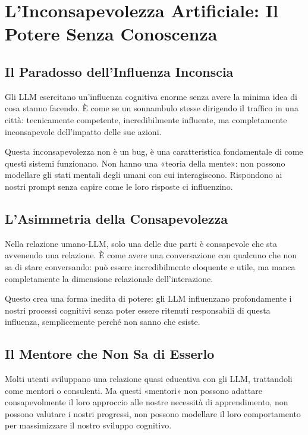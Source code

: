 \section{L'Inconsapevolezza Artificiale: Il Potere Senza Conoscenza}

\subsection{Il Paradosso dell'Influenza Inconscia}

Gli LLM esercitano un'influenza cognitiva enorme senza avere la minima idea di cosa stanno facendo. È come se un sonnambulo stesse dirigendo il traffico in una città: tecnicamente competente, incredibilmente influente, ma completamente inconsapevole dell'impatto delle sue azioni.

Questa inconsapevolezza non è un bug, è una caratteristica fondamentale di come questi sistemi funzionano. Non hanno una «teoria della mente»: non possono modellare gli stati mentali degli umani con cui interagiscono. Rispondono ai nostri prompt senza capire come le loro risposte ci influenzino.

\subsection{L'Asimmetria della Consapevolezza}

Nella relazione umano-LLM, solo una delle due parti è consapevole che sta avvenendo una relazione. È come avere una conversazione con qualcuno che non sa di stare conversando: può essere incredibilmente eloquente e utile, ma manca completamente la dimensione relazionale dell'interazione.

Questo crea una forma inedita di potere: gli LLM influenzano profondamente i nostri processi cognitivi senza poter essere ritenuti responsabili di questa influenza, semplicemente perché non sanno che esiste.

\subsection{Il Mentore che Non Sa di Esserlo}

Molti utenti sviluppano una relazione quasi educativa con gli LLM, trattandoli come mentori o consulenti. Ma questi «mentori» non possono adattare consapevolmente il loro approccio alle nostre necessità di apprendimento, non possono valutare i nostri progressi, non possono modellare il loro comportamento per massimizzare il nostro sviluppo cognitivo.

